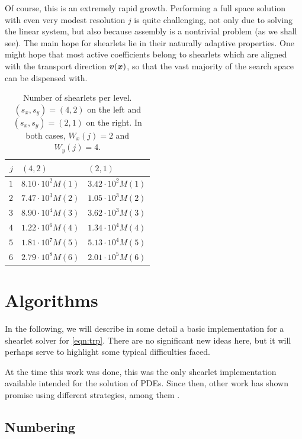 Of course, this is an extremely rapid growth. Performing a full space solution with even very modest
resolution $j$ is quite challenging, not only due to solving the linear system, but also because assembly is a
nontrivial problem (as we shall see). The main hope for shearlets lie in their naturally adaptive properties.
One might hope that most active coefficients belong to shearlets which are aligned with the transport
direction ${\bm v}({\bm x})$, so that the vast majority of the search space can be dispensed with.

\begin{table}
\centering
\def\arraystretch{1.4}
\begin{tabular}{r@{\qquad}l@{\qquad}l}
$j$ & $(4,2)$ & $(2,1)$ \\
\hline $1$ & $8.10\cdot10^{2}M(1)$ & $3.42\cdot10^{2}M(1)$ \\
\hline $2$ & $7.47\cdot10^{3}M(2)$ & $1.05\cdot10^{3}M(2)$ \\
\hline $3$ & $8.90\cdot10^{4}M(3)$ & $3.62\cdot10^{3}M(3)$ \\
\hline $4$ & $1.22\cdot10^{6}M(4)$ & $1.34\cdot10^{4}M(4)$ \\
\hline $5$ & $1.81\cdot10^{7}M(5)$ & $5.13\cdot10^{4}M(5)$ \\
\hline $6$ & $2.79\cdot10^{8}M(6)$ & $2.01\cdot10^{5}M(6)$ \\
\end{tabular}
\caption{Number of shearlets per level. $(s_x,s_y)=(4,2)$ on the left and $(s_x,s_y)=(2,1)$ on the right. In
both cases, $W_x(j)=2$ and $W_y(j)=4$.} \label{tbl:numlets}
\end{table}

\section{Algorithms} \label{sec:algorithms}

In the following, we will describe in some detail a basic implementation for a shearlet solver for
\eqref{eqn:trp}. There are no significant new ideas here, but it will perhaps serve to highlight some typical
difficulties faced.

At the time this work was done, this was the only shearlet implementation available intended for the solution
of PDEs. Since then, other work has shown promise using different strategies, among them \cite{ObermeierXX}.

\subsection{Numbering}

